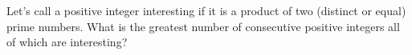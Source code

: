 Let’s call a positive integer interesting if it is a product of two (distinct or equal) prime numbers. What is the greatest number of consecutive positive integers all of which are interesting?